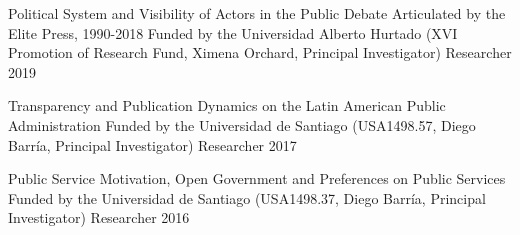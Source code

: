 \vspace{1mm}

\begin{cvhonors}
\cvhonor
{Political System and Visibility of Actors in the Public Debate Articulated by the Elite Press, 1990-2018}
{Funded by the Universidad Alberto Hurtado (XVI Promotion of Research Fund, Ximena Orchard, Principal Investigator)}
{Researcher}
{2019}
\end{cvhonors}

\vspace{1mm}

\begin{cvhonors}
\cvhonor
{Transparency and Publication Dynamics on the Latin American Public Administration}
{Funded by the Universidad de Santiago (USA1498.57, Diego Barría, Principal Investigator)}
{Researcher}
{2017}
\end{cvhonors}

\vspace{1mm}

\begin{cvhonors}
\cvhonor
{Public Service Motivation, Open Government and Preferences on Public Services}
{Funded by the Universidad de Santiago (USA1498.37, Diego Barría, Principal Investigator)}
{Researcher}
{2016}
\end{cvhonors}

\vspace{1mm}

